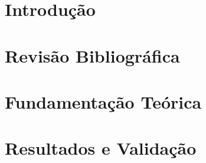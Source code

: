 \documentclass[a4paper,12pt,oneside,openany]{book}
\begin{document}
\frontmatter
\thispagestyle{empty}



\pagebreak            



     \tableofcontents
\listoffigures
\listoftables

\mainmatter
\cleardoublepage
\chapter{Introdução}
\label{cap1}


\chapter{Revisão Bibliográfica}
\label{cap2}


\chapter{Fundamentação Teórica}
\label{cap3}


\chapter{Resultados e Validação}
\label{cap5}

\end{document}
